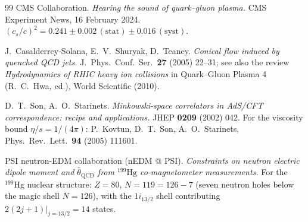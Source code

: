 \documentclass[11pt,a4paper]{article}
\theoremstyle{plain}
\theoremstyle{definition}
\theoremstyle{remark}
\begin{document}
\begin{thebibliography}{99}
CMS Collaboration.
\textit{Hearing the sound of quark--gluon plasma.}
CMS Experiment News, 16 February 2024.
$(c_s/c)^2 = 0.241 \pm 0.002\,(\mathrm{stat}) \pm 0.016\,(\mathrm{syst})$.

J.~Casalderrey-Solana, E.~V.~Shuryak, D.~Teaney.
\textit{Conical flow induced by quenched QCD jets.}
J.~Phys.~Conf.~Ser.~\textbf{27} (2005) 22--31;
see also the review \textit{Hydrodynamics of RHIC heavy ion collisions}
in Quark--Gluon Plasma 4 (R.~C.~Hwa, ed.), World Scientific (2010).

D.~T.~Son, A.~O.~Starinets.
\textit{Minkowski-space correlators in AdS/CFT correspondence:
recipe and applications.}
JHEP \textbf{0209} (2002) 042.
For the viscosity bound $\eta/s = 1/(4\pi)$:
P.~Kovtun, D.~T.~Son, A.~O.~Starinets, Phys.~Rev.~Lett.~\textbf{94}
(2005) 111601.

PSI neutron-EDM collaboration (nEDM @ PSI).
\textit{Constraints on neutron electric dipole moment and
$\bar\theta_{\mathrm{QCD}}$ from ${}^{199}\mathrm{Hg}$
co-magnetometer measurements.}
For the ${}^{199}\mathrm{Hg}$ nuclear structure: $Z = 80$,
$N = 119 = 126 - 7$ (seven neutron holes below the magic shell
$N = 126$), with the $1i_{13/2}$ shell contributing
$2(2j+1)|_{j=13/2} = 14$ states.

\end{thebibliography}
\end{document}
